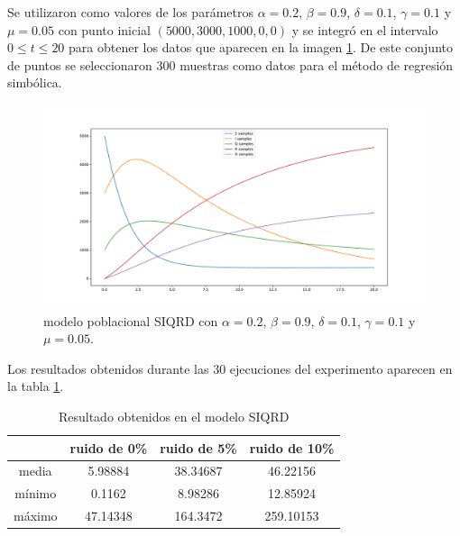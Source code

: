 Se utilizaron como valores de los parámetros $\alpha = 0.2$, $\beta = 0.9$, $\delta = 0.1$, $\gamma = 0.1$ y $\mu = 0.05$ con punto inicial $(5000, 3000, 1000, 0, 0)$ y se integró en el intervalo $0 \leq t \leq 20$ para obtener los datos que aparecen en la imagen \ref{fig:SIQRD}. De este conjunto de puntos se seleccionaron 300 muestras como datos para el método de regresión simbólica.

\begin{figure}[h]
    \centering
    \includegraphics[width=\textwidth]{"figures/SIQRD.pdf"}
    \caption{modelo poblacional SIQRD con $\alpha = 0.2$, $\beta = 0.9$, $\delta = 0.1$, $\gamma = 0.1$ y $\mu = 0.05$.}
    \label{fig:SIQRD}
\end{figure}

Los resultados obtenidos durante las 30 ejecuciones del experimento aparecen en la tabla \ref{table:experiment_SIQRD}.

\begin{table}[!h]
    \centering
    \caption{Resultado obtenidos en el modelo SIQRD}
    \begin{tabular}{|c|c|c|c|}
        \hline
               & \textbf{ruido de 0\%} & \textbf{ruido de 5\%} & \textbf{ruido de 10\%} \\
        \hline
        media  & 5.98884               & 38.34687              & 46.22156               \\
        \hline
        mínimo & 0.1162                & 8.98286               & 12.85924               \\
        \hline
        máximo & 47.14348              & 164.3472              & 259.10153              \\
        \hline
    \end{tabular}
    \label{table:experiment_SIQRD}
\end{table}


